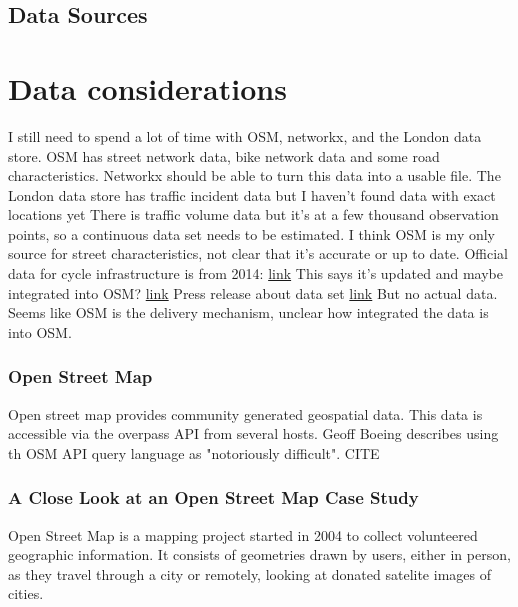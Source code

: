 \documentclass[11pt]{article} %
\begin{document}
 

\subsection{Data Sources}


\section{Data considerations}

I still need to spend a lot of time with OSM, networkx, and the London data store. 
OSM has street network data, bike network data and some road characteristics. 
Networkx should be able to turn this data into a usable file. 
The London data store has traffic incident data but I haven't found data with exact locations yet
There is traffic volume data but it's at a few thousand observation points, so a continuous data set needs to be estimated. 
I think OSM is my only source for street characteristics, not clear that it's accurate or up to date.
Official data for cycle infrastructure is from 2014: \href{https://data.gov.uk/dataset/47f0a282-3356-4530-8e7b-f67aaf4bec63/cycle-routes}{link}
This says it's updated and maybe integrated into OSM? \href{https://www.cyclestreets.net/blog/category/open-data/}{link}
Press release about data set \href{https://www.london.gov.uk/press-releases/mayoral/action-plan-to-get-more-londoners-cycling}{link}
But no actual data. Seems like OSM is the delivery mechanism, unclear how integrated the data is into OSM. 

\subsubsection{Open Street Map}
Open street map provides community generated geospatial data. This data is accessible via the overpass API from several hosts. 
Geoff Boeing describes using th OSM API query language as "notoriously difficult". CITE

\subsubsection{A Close Look at an Open Street Map Case Study}

Open Street Map is a mapping project started in 2004 to collect volunteered geographic information. It consists of geometries drawn by users, either in person, as they travel through a city or remotely, looking at donated satelite images of cities. 
\end{document}
